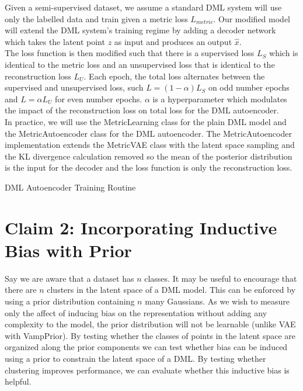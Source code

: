 \documentclass[./dissertation.tex]{subfiles}
\begin{document}
    Given a semi-supervised dataset, we assume a standard DML system will use only the labelled data and train given a metric loss $L_{metric}$. Our modified model will extend the DML system's training regime by adding a decoder network which takes the latent point $z$ as input and produces an output $\hat{x}$. \\
    
    The loss function is then modified such that there is a supervised loss $L_{S}$ which is identical to the metric loss and an unsupervised loss that is identical to the reconstruction loss $L_{U}$. Each epoch, the total loss alternates between the supervised and unsupervised loss, such $L = (1 - \alpha) L_{S}$ on odd number epochs and $L = \alpha L_{U}$ for even number epochs. $\alpha$ is a hyperparameter which modulates the impact of the reconstruction loss on total loss for the DML autoencoder. \\
    
    In practice, we will use the MetricLearning class for the plain DML model and the MetricAutoencoder class for the DML autoencoder. The MetricAutoencoder implementation extends the MetricVAE class with the latent space sampling and the KL divergence calculation removed so the mean of the posterior distribution is the input for the decoder and the loss function is only the reconstruction loss.

    \begin{algorithm}
    \caption{DML Autoencoder Training Routine}\label{alg:two}
    \end{algorithm}    
    
    \section{Claim 2: Incorporating Inductive Bias with Prior}
    Say we are aware that a dataset has $n$ classes. It may be useful to encourage that there are $n$ clusters in the latent space of a DML model. This can be enforced by using a prior distribution containing $n$ many Gaussians. As we wish to measure only the affect of inducing bias on the representation without adding any complexity to the model, the prior distribution will not be learnable (unlike VAE with VampPrior). By testing whether the classes of points in the latent space are organized along the prior components we can test whether bias can be induced using a prior to constrain the latent space of a DML. By testing whether clustering improves performance, we can evaluate whether this inductive bias is helpful. \\
    
\end{document}
